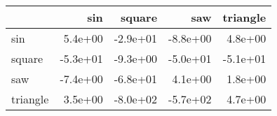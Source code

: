 \begin{tabular}{lrrrr}
\toprule
{} &      sin &   square &      saw &  triangle \\
\midrule
sin      &  5.4e+00 & -2.9e+01 & -8.8e+00 &   4.8e+00 \\
square   & -5.3e+01 & -9.3e+00 & -5.0e+01 &  -5.1e+01 \\
saw      & -7.4e+00 & -6.8e+01 &  4.1e+00 &   1.8e+00 \\
triangle &  3.5e+00 & -8.0e+02 & -5.7e+02 &   4.7e+00 \\
\bottomrule
\end{tabular}
